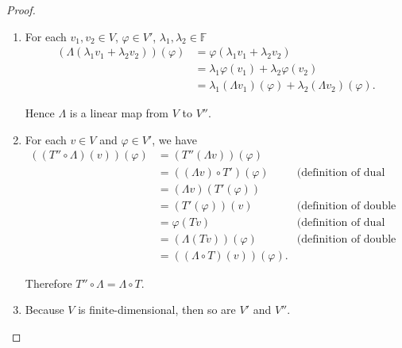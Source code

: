 \begin{proof}
    \begin{enumerate}[label={(\alph*)}]
        \item For each $v_{1}, v_{2}\in V$, $\varphi\in V'$, $\lambda_{1}, \lambda_{2}\in \mathbb{F}$
              \begin{align*}
                  (\Lambda (\lambda_{1}v_{1} + \lambda_{2}v_{2}))(\varphi) & = \varphi(\lambda_{1}v_{1} + \lambda_{2}v_{2})                               \\
                                                                           & = \lambda_{1}\varphi(v_{1}) + \lambda_{2}\varphi(v_{2})                      \\
                                                                           & = \lambda_{1}(\Lambda v_{1})(\varphi) + \lambda_{2}(\Lambda v_{2})(\varphi).
              \end{align*}

              Hence $\Lambda$ is a linear map from $V$ to $V''$.
        \item For each $v\in V$ and $\varphi\in V'$, we have
              \begin{align*}
                  ((T''\circ \Lambda)(v))(\varphi) & = (T''(\Lambda v))(\varphi)                                                \\
                                                   & = ((\Lambda v)\circ T')(\varphi)  & \text{(definition of dual map)}        \\
                                                   & = (\Lambda v)(T'(\varphi))                                                 \\
                                                   & = (T'(\varphi))(v)                & \text{(definition of double dual map)} \\
                                                   & = \varphi(Tv)                     & \text{(definition of dual map)}        \\
                                                   & = (\Lambda(Tv))(\varphi)          & \text{(definition of double dual map)} \\
                                                   & = ((\Lambda\circ T)(v))(\varphi).
              \end{align*}

              Therefore $T''\circ \Lambda = \Lambda \circ T$.
        \item Because $V$ is finite-dimensional, then so are $V'$ and $V''$.


\end{enumerate}
\end{proof}
